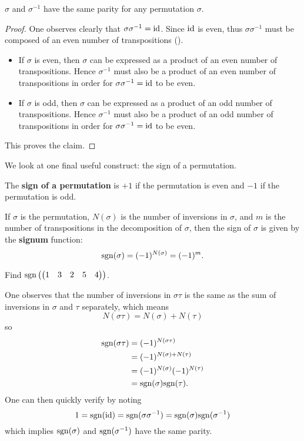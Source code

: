 \begin{corollary}\label{corollary-permutation-and-inverse-have-same-parity}
    $\sigma$ and $\sigma^{-1}$ have the same parity for any permutation $\sigma$.
\end{corollary}
\begin{proof}
    One observes clearly that $\sigma\sigma^{-1} = \mathrm{id}$. Since $\mathrm{id}$ is even, thus $\sigma\sigma^{-1}$ must be composed of an even number of transpositions ().
    \begin{itemize}
        \item If $\sigma$ is even, then $\sigma$ can be expressed as a product of an even number of transpositions. Hence $\sigma^{-1}$ must also be a product of an even number of transpositions in order for $\sigma\sigma^{-1} = \mathrm{id}$ to be even.
        \item If $\sigma$ is odd, then $\sigma$ can be expressed as a product of an odd number of transpositions. Hence $\sigma^{-1}$ must also be a product of an odd number of transpositions in order for $\sigma\sigma^{-1} = \mathrm{id}$ to be even.
    \end{itemize}
    This proves the claim.
\end{proof}

We look at one final useful construct: the sign of a permutation.
\begin{definition}
    The \textbf{sign of a permutation} is $+1$ if the permutation is even and $-1$ if the permutation is odd.
\end{definition}
If $\sigma$ is the permutation, $N(\sigma)$ is the number of inversions in $\sigma$, and $m$ is the number of transpositions in the decomposition of $\sigma$, then the sign of $\sigma$ is given by the \textbf{signum} function:
\[
    \mathrm{sgn}(\sigma) = (-1)^{N(\sigma)} = (-1)^m.
\]
\begin{exercise}
    Find $\mathrm{sgn}\left(\begin{pmatrix}1&3&2&5&4\end{pmatrix}\right)$.
\end{exercise}

One observes that the number of inversions in $\sigma\tau$ is the same as the sum of inversions in $\sigma$ and $\tau$ separately, which means
\[
    N(\sigma\tau) = N(\sigma) + N(\tau)
\]
so
\begin{align*}
    \mathrm{sgn}(\sigma\tau) &= (-1)^{N(\sigma\tau)}\\
    &= (-1)^{N(\sigma) + N(\tau)}\\
    &= (-1)^{N(\sigma)}(-1)^{N(\tau)}\\
    &= \mathrm{sgn}(\sigma)\mathrm{sgn}(\tau).
\end{align*}
One can then quickly verify  by noting
\[
    1 = \mathrm{sgn}(\mathrm{id}) = \mathrm{sgn}(\sigma\sigma^{-1}) = \mathrm{sgn}(\sigma)\mathrm{sgn}(\sigma^{-1})
\]
which implies $\mathrm{sgn}(\sigma)$ and $\mathrm{sgn}(\sigma^{-1})$ have the same parity.

